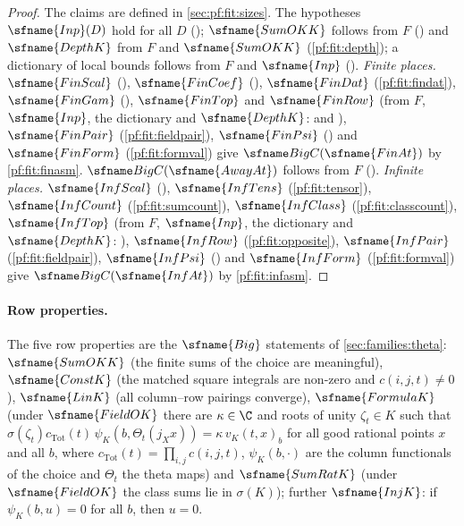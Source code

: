\begin{proof}
The claims are defined in \cref{sec:pf:fit:sizes}. The hypotheses $\sfname{Inp}(D)$ hold for all $D$
(); $\sfname{SumOKK}$ follows from $F$
() and $\sfname{DepthK}$ from $F$ and $\sfname{SumOKK}$ (\cref{pf:fit:depth});
a dictionary of local bounds follows from $F$ and $\sfname{Inp}$ ().
\emph{Finite places.} $\sfname{FinScal}$ (), $\sfname{FinCoef}$
(), $\sfname{FinDat}$ (\cref{pf:fit:findat}), $\sfname{FinGam}$
(), $\sfname{FinTop}$ and $\sfname{FinRow}$ (from $F$, $\sfname{Inp}$,
the dictionary and $\sfname{DepthK}$:  and ),
$\sfname{FinPair}$ (\cref{pf:fit:fieldpair}), $\sfname{FinPsi}$ ()
and $\sfname{FinForm}$ (\cref{pf:fit:formval}) give $\fitBigC(\sfname{FinAt})$ by \cref{pf:fit:finasm}. $\fitBigC(\sfname{AwayAt})$
follows from $F$ ().
\emph{Infinite places.} $\sfname{InfScal}$ (), $\sfname{InfTens}$
(\cref{pf:fit:tensor}), $\sfname{InfCount}$ (\cref{pf:fit:sumcount}), $\sfname{InfClass}$ (\cref{pf:fit:classcount}),
$\sfname{InfTop}$ (from $F$, $\sfname{Inp}$, the dictionary and $\sfname{DepthK}$:
), $\sfname{InfRow}$ (\cref{pf:fit:opposite}),
$\sfname{InfPair}$ (\cref{pf:fit:fieldpair}), $\sfname{InfPsi}$ () and
$\sfname{InfForm}$ (\cref{pf:fit:formval}) give $\fitBigC(\sfname{InfAt})$ by \cref{pf:fit:infasm}.
\end{proof}

\paragraph{Row properties.}
The five row properties are the $\sfname{Big}$ statements of \cref{sec:families:theta}: $\sfname{SumOKK}$ (the finite sums
of the choice are meaningful), $\sfname{ConstK}$ (the matched square integrals are non-zero and $c(i,j,t)\ne0$),
$\sfname{LinK}$ (all column--row pairings converge), $\sfname{FormulaK}$ (under $\sfname{FieldOK}$ there are $\kappa\in\C$
and roots of unity $\zeta_t\in K$ such that $\sigma(\zeta_t)c_{\mathrm{Tot}}(t)\,\psi_K(b,\Theta_t(j_Xx))=\kappa\,
v_K(t,x)_b$ for all good rational points $x$ and all $b$, where $c_{\mathrm{Tot}}(t)=\prod_{i,j}c(i,j,t)$, $\psi_K(b,\cdot)$ are
the column functionals of the choice and $\Theta_t$ the theta maps) and $\sfname{SumRatK}$ (under $\sfname{FieldOK}$ the class
sums lie in $\sigma(K)$); further $\sfname{InjK}$: if $\psi_K(b,u)=0$ for all $b$, then $u=0$.

